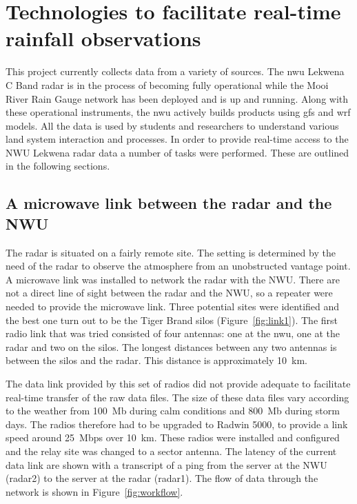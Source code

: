 \documentclass{wrcreport}
\begin{document}
\chapter{Technologies to facilitate real-time rainfall observations}
\label{chap:real-time}

This project currently collects data from a variety of sources. The
\gls{nwu} Lekwena C Band radar is in the process of becoming fully
operational while the Mooi River Rain Gauge network has been deployed
and is up and running. Along with these operational instruments, the
\gls{nwu} actively builds products using \gls{gfs} and \gls{wrf} models. All
the data is used by students and researchers to understand various
land system interaction and processes. In order to provide real-time
access to the NWU Lekwena radar data a number of tasks were performed.
These are outlined in the following sections.

\section{A microwave link between the radar and the NWU}

The radar is situated on a fairly remote site. The setting is
determined by the need of the radar to observe the atmosphere from an
unobstructed vantage point. A microwave link was installed to network
the radar with the NWU. There are not a direct line of sight between
the radar and the NWU, so a repeater were needed to provide the
microwave link. Three potential sites were identified and the best one
turn out to be the Tiger Brand silos (Figure~\ref{fig:link1}). The
first radio link that was tried consisted of four antennas: one at the
\gls{nwu}, one at the radar and two on the silos. The longest
distances between any two antennas is between the silos and the radar.
This distance is approximately \SI{10}{km}. 

The data link provided by this set of radios did not provide adequate
to facilitate real-time transfer of the raw data files. The size of
these data files vary according to the weather from \SI{100}{Mb}
during calm conditions and \SI{800}{Mb} during storm days. The radios
therefore had to be upgraded to Radwin 5000, to provide a link speed
around \SI{25}{Mbps} over \SI{10}{km}. These radios were installed and
configured and the relay site was changed to a sector antenna. The
latency of the current data link are shown with a transcript of a ping
from the server at the NWU (radar2) to the server at the radar
(radar1). The flow of data through the network is shown in
Figure~\ref{fig:workflow}.
\end{document}
